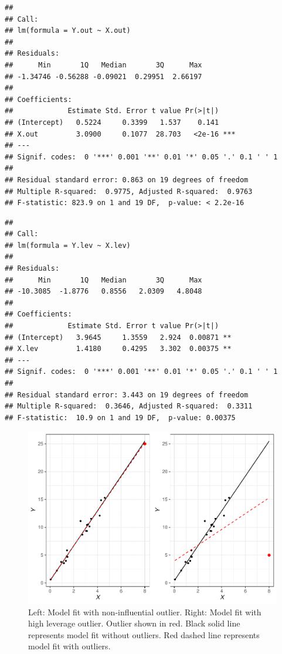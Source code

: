 \documentclass[
]{book}
\begin{document}
\begin{verbatim}
## 
## Call:
## lm(formula = Y.out ~ X.out)
## 
## Residuals:
##      Min       1Q   Median       3Q      Max 
## -1.34746 -0.56288 -0.09021  0.29951  2.66197 
## 
## Coefficients:
##             Estimate Std. Error t value Pr(>|t|)    
## (Intercept)   0.5224     0.3399   1.537    0.141    
## X.out         3.0900     0.1077  28.703   <2e-16 ***
## ---
## Signif. codes:  0 '***' 0.001 '**' 0.01 '*' 0.05 '.' 0.1 ' ' 1
## 
## Residual standard error: 0.863 on 19 degrees of freedom
## Multiple R-squared:  0.9775, Adjusted R-squared:  0.9763 
## F-statistic: 823.9 on 1 and 19 DF,  p-value: < 2.2e-16
\end{verbatim}

\begin{verbatim}
## 
## Call:
## lm(formula = Y.lev ~ X.lev)
## 
## Residuals:
##      Min       1Q   Median       3Q      Max 
## -10.3085  -1.8776   0.8556   2.0309   4.8048 
## 
## Coefficients:
##             Estimate Std. Error t value Pr(>|t|)   
## (Intercept)   3.9645     1.3559   2.924  0.00871 **
## X.lev         1.4180     0.4295   3.302  0.00375 **
## ---
## Signif. codes:  0 '***' 0.001 '**' 0.01 '*' 0.05 '.' 0.1 ' ' 1
## 
## Residual standard error: 3.443 on 19 degrees of freedom
## Multiple R-squared:  0.3646, Adjusted R-squared:  0.3311 
## F-statistic:  10.9 on 1 and 19 DF,  p-value: 0.00375
\end{verbatim}

\begin{figure}

{\centering \includegraphics[width=1\linewidth]{People_Analytics_Lifecycle_files/figure-latex/high-leverage-1} 

}

\caption{Left: Model fit with non-influential outlier. Right: Model fit with high leverage outlier. Outlier shown in red. Black solid line represents model fit without outliers. Red dashed line represents model fit with outliers.}\label{fig:high-leverage}
\end{figure}
\end{document}
